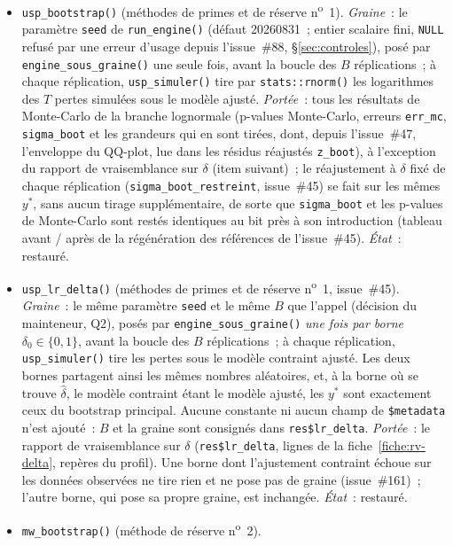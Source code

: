 \documentclass[a4paper,11pt]{article}
\newcommand{\code}[1]{\texttt{\small #1}}
\begin{document}
\begin{itemize}
\item \code{usp\_bootstrap()} (méthodes de primes et de réserve
  n\textsuperscript{o}~1). \emph{Graine}~: le paramètre \code{seed} de
  \code{run\_engine()} (défaut 20260831~; entier scalaire fini, \code{NULL} refusé par une erreur
  d'usage depuis l'issue~\#88, §\ref{sec:controles}), posé par \code{engine\_sous\_graine()} une
  seule fois, avant la boucle des $B$ réplications~; à chaque réplication,
  \code{usp\_simuler()} tire par \code{stats::rnorm()} les logarithmes des $T$
  pertes simulées sous le modèle ajusté. \emph{Portée}~: tous les résultats de Monte-Carlo de la
  branche lognormale (p-values Monte-Carlo, erreurs \code{err\_mc},
  \code{sigma\_boot} et les grandeurs qui en sont tirées, dont, depuis l'issue~\#47, l'enveloppe du
  QQ-plot, lue dans les résidus réajustés \code{z\_boot}), à l'exception du rapport de
  vraisemblance sur $\delta$ (item suivant)~; le réajustement à $\delta$ fixé de chaque
  réplication (\code{sigma\_boot\_restreint}, issue~\#45) se fait sur les mêmes $y^{*}$, sans
  aucun tirage supplémentaire, de sorte que \code{sigma\_boot} et les p-values de Monte-Carlo
  sont restés identiques au bit près à son introduction (tableau avant / après de la
  régénération des références de l'issue~\#45). \emph{État}~: restauré.
\item \code{usp\_lr\_delta()} (méthodes de primes et de réserve n\textsuperscript{o}~1,
  issue~\#45). \emph{Graine}~: le même paramètre \code{seed} et le même $B$ que l'appel
  (décision du mainteneur, Q2), posés par \code{engine\_sous\_graine()} \emph{une fois par
  borne} $\delta_0 \in \{0, 1\}$, avant la boucle des $B$ réplications~; à chaque réplication,
  \code{usp\_simuler()} tire les pertes sous le modèle contraint ajusté. Les deux bornes
  partagent ainsi les mêmes nombres aléatoires, et, à la borne où se trouve $\hat\delta$, le
  modèle contraint étant le modèle ajusté, les $y^{*}$ sont exactement ceux du bootstrap
  principal. Aucune constante ni aucun champ de \code{\$metadata} n'est ajouté~: $B$ et la
  graine sont consignés dans \code{res\$lr\_delta}. \emph{Portée}~: le rapport de vraisemblance
  sur $\delta$ (\code{res\$lr\_delta}, lignes de la fiche~\ref{fiche:rv-delta}, repères du
  profil). Une borne dont l'ajustement contraint échoue sur les données observées ne tire rien
  et ne pose pas de graine (issue~\#161)~; l'autre borne, qui pose sa propre graine, est
  inchangée. \emph{État}~: restauré.
\item \code{mw\_bootstrap()} (méthode de réserve n\textsuperscript{o}~2).

\end{itemize}
\end{document}
